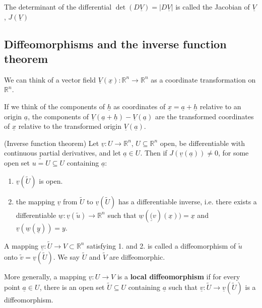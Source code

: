 \begin{definition}
	The determinant of the differential $\det (D\underline{V}) = |D\underline{V}|$ is called the Jacobian of $\underline{V}$, $J(\underline{V})$
\end{definition}

\subsection{Diffeomorphisms and the inverse function theorem}

We can think of a vector field $\underline{V}(\underline{x}): \mathbb{R}^n \rightarrow \mathbb{R}^n$ as a coordinate transformation on $\mathbb{R}^n$.

If we think of the components of $\underline{h}$ as coordinates of $\underline{x} = \underline{a} + \underline{h}$ relative to an origin $\underline{a}$, the components of $\underline{V}(\underline{a} + \underline{h}) - \underline{V}(\underline{a})$ are the transformed coordinates of $\underline{x}$ relative to the transformed origin $\underline{V}(\underline{a})$.

\begin{theorem}
	(Inverse function theorem) Let $\underline{v}: U \rightarrow \mathbb{R}^n$, $U \subseteq \mathbb{R}^n$ open, be differentiable with continuous partial derivatives, and let $\underline{a} \in U$. Then if $J(\underline{v}(\underline{a})) \ne 0$, for some open set $\tilde{u=U} \subseteq U$ containing $\underline{a}$:

	\begin{enumerate}
		\item $\underline{v}(\tilde{U})$ is open.
		\item the mapping $\underline{v}$ from $\tilde{U}$ to $\underline{v}(\tilde{U})$ has a differentiable inverse, i.e. there exists a differentiable $\underline{w}: \underline{v}(\tilde{u}) \rightarrow \mathbb{R}^n$ such that $\underline{w}(\underline(v)(\underline{x})) = \underline{x}$ and $\underline{v}(\underline{w}(\underline{y})) = y$.
	\end{enumerate}
\end{theorem}

\begin{definition}
	A mapping $\underline{v}: \tilde{U} \rightarrow V \subset \mathbb{R}^n$ satisfying 1. and 2. is called a diffeomorphism of $\tilde{u}$ onto $\tilde{v} = \underline{v}(\tilde{U})$. We say $\tilde{U}$ and $\tilde{V}$ are diffeomorphic.

	More generally, a mapping $\underline{v}: U \rightarrow V$ is a \textbf{local diffeomorphism} if for every point $\underline{a} \in U$, there is an open set $\tilde{U} \subseteq U$ containing $\underline{a}$ such that $\underline{v}: \tilde{U} \rightarrow \underline{v}(\tilde{U})$ is a diffeomorphism.
\end{definition}

